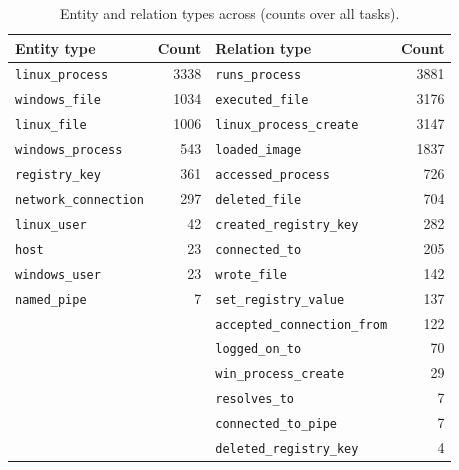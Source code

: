 \begin{table}[t]\centering\scriptsize
\caption{Entity and relation types across \bench (counts over all tasks).}
\label{tab:types}
\begin{tabular}{@{}lr@{\hspace{1.2em}}lr@{}}\toprule
Entity type & Count & Relation type & Count\\\midrule
\texttt{linux\_process} & 3338 & \texttt{runs\_process} & 3881\\
\texttt{windows\_file} & 1034 & \texttt{executed\_file} & 3176\\
\texttt{linux\_file} & 1006 & \texttt{linux\_process\_create} & 3147\\
\texttt{windows\_process} & 543 & \texttt{loaded\_image} & 1837\\
\texttt{registry\_key} & 361 & \texttt{accessed\_process} & 726\\
\texttt{network\_connection} & 297 & \texttt{deleted\_file} & 704\\
\texttt{linux\_user} & 42 & \texttt{created\_registry\_key} & 282\\
\texttt{host} & 23 & \texttt{connected\_to} & 205\\
\texttt{windows\_user} & 23 & \texttt{wrote\_file} & 142\\
\texttt{named\_pipe} & 7 & \texttt{set\_registry\_value} & 137\\
 & & \texttt{accepted\_connection\_from} & 122\\
 & & \texttt{logged\_on\_to} & 70\\
 & & \texttt{win\_process\_create} & 29\\
 & & \texttt{resolves\_to} & 7\\
 & & \texttt{connected\_to\_pipe} & 7\\
 & & \texttt{deleted\_registry\_key} & 4\\
\bottomrule\end{tabular}\end{table}
